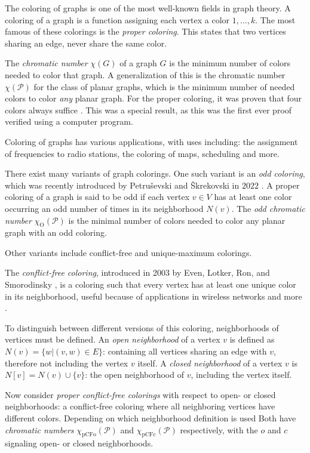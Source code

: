 \documentclass{article}
\begin{document}
The coloring of graphs is one of the most well-known fields in graph theory. A coloring of a graph is a function assigning each vertex a color $1, \dots, k$. The most famous of these colorings is the\textit{ proper coloring}. This states that two vertices sharing an edge, never share the same color. 

The \textit{chromatic number} $\chi(G)$ of a graph $G$ is the minimum number of colors needed to color that graph. A generalization of this is the chromatic number $\chi(\mathcal{P})$ for the class of planar graphs, which is the minimum number of needed colors to color \textit{any} planar graph. For the proper coloring, it was proven that four colors always suffice \cite{appel1976every}. This was a special result, as this was the first ever proof verified using a computer program.

Coloring of graphs has various applications, with uses including: the assignment of frequencies to radio stations, the coloring of maps, scheduling and more.

There exist many variants of graph colorings. One such variant is an \textit{odd coloring}, which was recently introduced by Petruševski and Škrekovski in $2022$ \cite{PETRUSEVSKI2022385}. A proper coloring of a graph is said to be odd if each vertex $v \in V$ has at least one color occurring an odd number of times in its neighborhood $N(v)$. The \textit{odd chromatic number} $\chi_{\mathrm{O}}(\mathcal{P})$ is the minimal number of colors needed to color any planar graph with an odd coloring.

Other variants include conflict-free and unique-maximum colorings. 

The \textit{conflict-free coloring}, introduced in 2003 by Even, Lotker, Ron, and Smorodinsky \cite{even2003conflict}, is a coloring such that every vertex has at least one unique color in its neighborhood, useful because of applications in wireless networks and more \cite{smorodinsky2013conflict}.

To distinguish between different versions of this coloring, neighborhoods of vertices must be defined. An \textit{open neighborhood} of a vertex $v$ is defined as $N(v) = \{w | (v, w) \in E\}$: containing all vertices sharing an edge with $v$, therefore not including the vertex $v$ itself. A \textit{closed neighborhood} of a vertex $v$ is $N[v] = N(v) \cup \{v\}$: the open neighborhood of $v$, including the vertex itself. 

Now consider \textit{proper conflict-free colorings} with respect to open- or closed neighborhoods: a conflict-free coloring where all neighboring vertices have different colors. Depending on which neighborhood definition is used
Both have \textit{chromatic numbers} $\chi_{\mathrm{pCFo}}(\mathcal{P})$ and $\chi_{\mathrm{pCFc}}(\mathcal{P})$ respectively, with the $o$ and $c$ signaling open- or closed neighborhoods.
\end{document}
